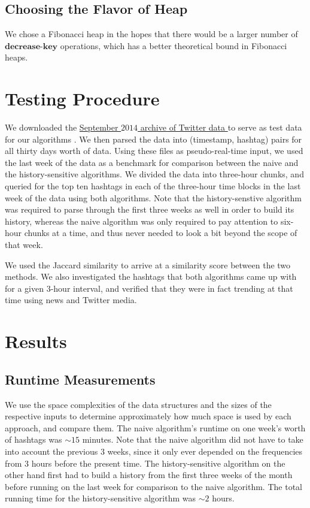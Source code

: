 \documentclass[twoside]{article}
\newcommand{\cc}[1]
 {\textbf{\cite{#1}}}
\begin{document}
{\subsection{Choosing the Flavor of Heap}

We chose a Fibonacci heap in the hopes that there would be a larger number of $\textbf{decrease-key}$ operations, which has a better theoretical bound in Fibonacci heaps. 


\section{Testing Procedure}

We downloaded the \href{https://archive.org/details/twitterstream}{September $2014$ archive of Twitter data } to serve as test data for our algorithms \cc{Twitter2014}. We then parsed the data into (timestamp, hashtag) pairs
for all thirty days worth of data. Using these files as pseudo-real-time input, we used the last week of the data as a benchmark for comparison between the naive and the history-sensitive algorithms. We divided the data into three-hour chunks, and queried for the top ten hashtags in each of the three-hour time blocks
in the last week of the data using both algorithms. Note that the history-senstive algorithm was required to parse through the first three weeks as well in order to build its history, whereas the naive algorithm was only required to pay attention to six-hour chunks at a time, and thus never needed to look a bit beyond the scope of that week. 

We used the Jaccard similarity to arrive at a similarity score between the two methods. We also investigated the hashtags that both algorithms came up with for a given $3$-hour interval, and verified
that they were in fact trending at that time using news and Twitter media. 


\section{Results}

\subsection{Runtime Measurements}

We use the space complexities of the data structures and the sizes of the 
respective inputs to determine approximately how much space is used by each
approach, and compare them. The naive algorithm's runtime on one week's worth
of hashtags was $\sim 15$ minutes. Note that the naive algorithm did not have 
to take into account the previous $3$ weeks, since it only ever depended on 
the frequencies from $3$ hours before the present time. The history-sensitive
algorithm on the other hand first had to build a history from the first three
weeks of the month before running on the last week for comparison to the naive
algorithm. The total running time for the history-sensitive algorithm was $
\sim 2$ hours.

}
\end{document}
